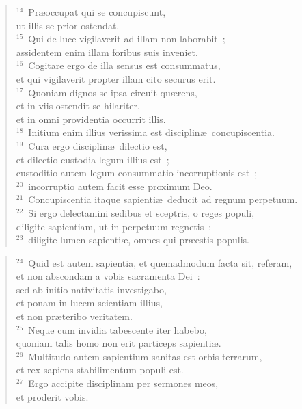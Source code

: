 \begin{verse}
${}^{14}$~Pr\ae occupat qui se concupiscunt,\\ ut illis se prior ostendat.\\
${}^{15}$~Qui de luce vigilaverit ad illam non laborabit~;\\ assidentem enim illam foribus suis inveniet.\\
${}^{16}$~Cogitare ergo de illa sensus est consummatus,\\ et qui vigilaverit propter illam cito securus erit.\\
${}^{17}$~Quoniam dignos se ipsa circuit qu\ae rens,\\ et in viis ostendit se hilariter,\\ et in omni providentia occurrit illis.\\
${}^{18}$~Initium enim illius verissima est disciplin\ae\ concupiscentia.\\
${}^{19}$~Cura ergo disciplin\ae\ dilectio est,\\ et dilectio custodia legum illius est~;\\ custoditio autem legum consummatio incorruptionis est~;\\
${}^{20}$~incorruptio autem facit esse proximum Deo.\\
${}^{21}$~Concupiscentia itaque sapienti\ae\ deducit ad regnum perpetuum.\\
${}^{22}$~Si ergo delectamini sedibus et sceptris, o reges populi,\\ diligite sapientiam, ut in perpetuum regnetis~:\\
${}^{23}$~diligite lumen sapienti\ae , omnes qui pr\ae estis populis.\end{verse}


\begin{verse}${}^{24}$~Quid est autem sapientia, et quemadmodum facta sit, referam,\\ et non abscondam a vobis sacramenta Dei~:\\ sed ab initio nativitatis investigabo,\\ et ponam in lucem scientiam illius,\\ et non pr\ae teribo veritatem.\\
${}^{25}$~Neque cum invidia tabescente iter habebo,\\ quoniam talis homo non erit particeps sapienti\ae .\\
${}^{26}$~Multitudo autem sapientium sanitas est orbis terrarum,\\ et rex sapiens stabilimentum populi est.\\
${}^{27}$~Ergo accipite disciplinam per sermones meos,\\ et proderit vobis.\end{verse}



